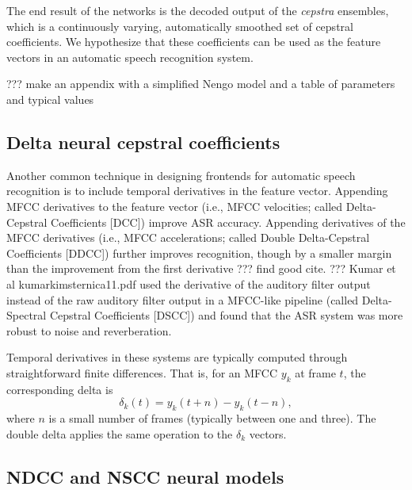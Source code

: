 The end result of the networks
is the decoded output
of the \textit{cepstra} ensembles,
which is a continuously varying,
automatically smoothed set of cepstral coefficients.
We hypothesize that these coefficients can be used
as the feature vectors in an
automatic speech recognition system.

??? make an appendix with a simplified Nengo model
and a table of parameters and typical values

\subsection{Delta neural cepstral coefficients}

Another common technique in designing frontends
for automatic speech recognition is to
include temporal derivatives
in the feature vector.
Appending MFCC derivatives
to the feature vector
(i.e., MFCC velocities;
called Delta-Cepstral Coefficients [DCC])
improve ASR accuracy.
Appending derivatives of the MFCC derivatives
(i.e., MFCC accelerations;
called Double Delta-Cepstral Coefficients [DDCC])
further improves recognition,
though by a smaller margin than
the improvement from the first derivative
??? find good cite.
??? Kumar et al kumarkimsternica11.pdf
used the derivative of the auditory filter output
instead of the raw auditory filter output
in a MFCC-like pipeline
(called Delta-Spectral Cepstral Coefficients [DSCC])
and found that the ASR system
was more robust to noise and reverberation.

Temporal derivatives in these systems
are typically computed through straightforward
finite differences.
That is, for an MFCC $y_k$
at frame $t$, the corresponding delta is
\begin{equation}
  \label{dcc}
  \delta_k(t) = y_k(t+n) - y_k(t-n),
\end{equation}
where $n$ is a small number of frames
(typically between one and three).
The double delta applies the same operation
to the $\delta_k$ vectors.


\subsection{NDCC and NSCC neural models}

